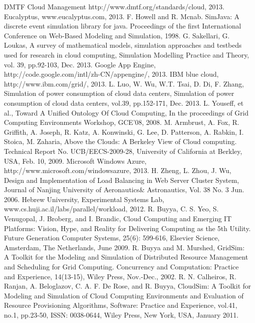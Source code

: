 \documentclass[3p, twocolumn]{elsarticle}
\begin{document}
\begin{thebibliography}{99}
DMTF Cloud Management
http://www.dmtf.org/standards/cloud, 2013.
Eucalyptus, www.eucalyptus.com, 2013.
F. Howell and R. Mcnab. SimJava: A discrete event simulation library for java. Proceedings of the first International Conference on Web-Based Modeling and Simulation, 1998.
G. Sakellari, G. Loukas, A survey of mathematical models, simulation approaches and testbeds used for research in cloud computing, Simulation Modelling Practice and Theory, vol. 39, pp.92-103, Dec. 2013.
Google App Engine, http://code.google.com/intl/zh-CN/appengine/, 2013.
IBM blue cloud, http://www.ibm.com/grid/, 2013.
L. Luo, W. Wu, W.T. Tsai, D. Di, F. Zhang, Simulation of power consumption of cloud data centers, Simulation of power consumption of cloud data centers, vol.39, pp.152-171, Dec. 2013.
L. Youseff, et al., Toward A Unified Ontology Of Cloud Computing, In the proceedings of Grid Computing Environments Workshop, GCE'08, 2008.
M. Armbrust, A. Fox, R. Griffith, A. Joseph, R. Katz, A. Konwinski, G. Lee, D. Patterson, A. Rabkin, I. Stoica, M. Zaharia, Above the Clouds: A Berkeley View of Cloud computing. Technical Report No. UCB/EECS-2009-28, University of California at Berkley, USA, Feb. 10, 2009.
Microsoft Windows Azure,
http://www.microsoft.com/windowsazure, 2013.
H. Zheng, L. Zhou, J. Wu, Design and Implementation of Load Balancing in Web Server Cluster System, Journal of Nanjing University of Aeronautics$\&$ Astronautics, Vol. 38 No. 3 Jun. 2006.
Hebrew University, Experimental Systems Lab, www.cs.huji.ac.il/labs/parallel/workload, 2012.
R. Buyya, C. S. Yeo, S. Venugopal, J. Broberg, and I. Brandic, Cloud Computing and Emerging IT Platforms: Vision, Hype, and Reality for Delivering Computing as the 5th Utility. Future Generation Computer Systems, 25(6): 599-616, Elsevier Science, Amsterdam, The Netherlands, June 2009.
R. Buyya and M. Murshed, GridSim: A Toolkit for the Modeling and Simulation of Distributed Resource Management and Scheduling for Grid Computing. Concurrency and Computation: Practice and Experience, 14(13-15), Wiley Press, Nov.-Dec., 2002.
R. N. Calheiros, R. Ranjan, A. Beloglazov, C. A. F. De Rose, and R. Buyya, CloudSim: A Toolkit for Modeling and Simulation of Cloud Computing Environments and Evaluation of Resource Provisioning Algorithms, Software: Practice and Experience, vol.41, no.1, pp.23-50, ISSN: 0038-0644, Wiley Press, New York, USA, January 2011.

\end{thebibliography}
\end{document}
